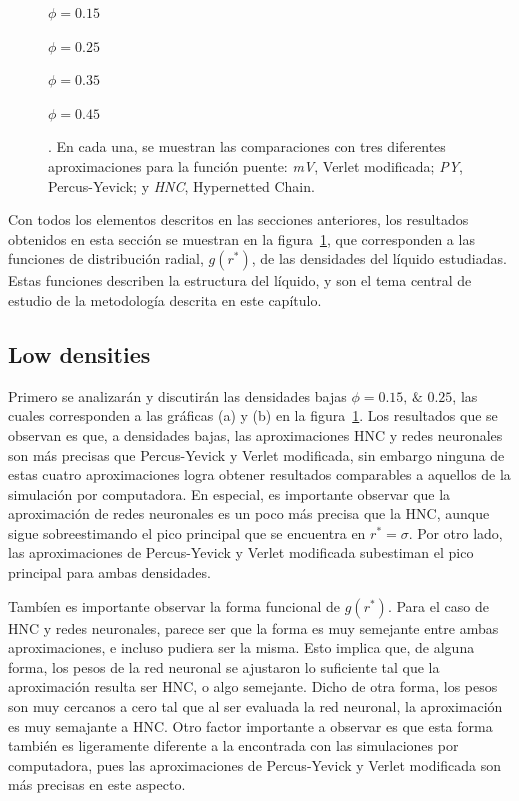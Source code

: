 \begin{figure}[p]
{    \begin{enumerate*}[label=(\alph*),itemjoin={,\enspace}]
        \item $\phi=\num{0.15}$
        \item $\phi=\num{0.25}$
        \item $\phi=\num{0.35}$
        \item $\phi=\num{0.45}$
    \end{enumerate*}
    . En cada una, se muestran las comparaciones con tres diferentes aproximaciones para la función puente: \emph{mV}, Verlet modificada; \emph{PY}, Percus-Yevick; y \emph{HNC}, Hypernetted Chain.
    }
    \label{fig:estructuras-neuronales}
\end{figure}

Con todos los elementos descritos en las secciones anteriores, los resultados obtenidos en 
esta sección se muestran en la figura~\ref{fig:estructuras-neuronales}, que corresponden
a las funciones de distribución radial, $g(r^*)$, de las densidades del líquido estudiadas.
Estas funciones describen la estructura del líquido, y son el tema central de estudio
de la metodología descrita en este capítulo.

\subsection{Low densities}
Primero se analizarán y discutirán las densidades bajas $\phi=\numlist{0.15; 0.25}$,
las cuales corresponden a las gráficas (a) y (b) en la figura~\ref{fig:estructuras-neuronales}.
Los resultados que se observan es que, a densidades bajas, las aproximaciones HNC y
redes neuronales son más precisas que Percus-Yevick y Verlet modificada, sin embargo
ninguna de estas cuatro aproximaciones logra obtener resultados comparables a aquellos
de la simulación por computadora. En especial, es importante observar que
la aproximación de redes neuronales es un poco más precisa que la HNC, aunque sigue 
sobreestimando el pico principal que se encuentra en $r^* = \sigma$.
Por otro lado, las aproximaciones de Percus-Yevick y Verlet modificada subestiman el pico
principal para ambas densidades.

Tambíen es importante observar la forma funcional de $g(r^*)$. Para el caso de HNC y redes 
neuronales, parece ser que la forma es muy semejante entre ambas aproximaciones, e incluso 
pudiera ser la misma. Esto implica que, de alguna forma, los pesos de la red neuronal se 
ajustaron lo suficiente tal que la aproximación resulta ser HNC, o algo semejante.
Dicho de otra forma, los pesos son muy cercanos a cero tal que al ser
evaluada la red neuronal, la aproximación es muy semajante a HNC.
Otro factor importante a observar es que esta forma también es ligeramente diferente a
la encontrada con las simulaciones por computadora, pues las aproximaciones de
Percus-Yevick y Verlet modificada son más precisas en este aspecto.

